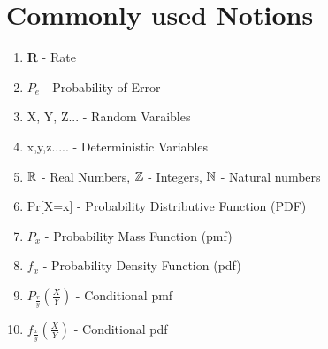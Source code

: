 \documentclass[a4paper]{article}
\begin{document}
\section{Commonly used Notions}
\begin{enumerate}
\item \textbf{R} - Rate
\item $P_e$ - Probability of Error
\item X, Y, Z...  - Random Varaibles
\item x,y,z..... - Deterministic Variables
\item $\mathbb R$ - Real Numbers, $\mathbb Z$ - Integers, $\mathbb N$ - Natural numbers
\item Pr[X=x] - Probability Distributive Function (PDF)
\item $P_x$ - Probability Mass Function (pmf)
\item $f_x$ - Probability Density Function (pdf)
\item $P_{\frac{x}{y}}(\frac{X}{Y})$ - Conditional pmf
\item $f_{\frac{x}{y}}(\frac{X}{Y})$ - Conditional pdf
\end{enumerate}

\end{document}
